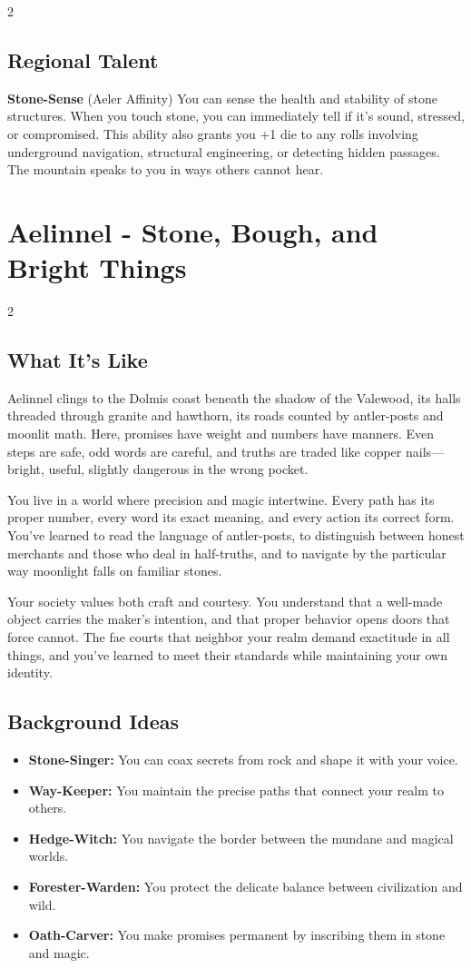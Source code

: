 \documentclass[11pt]{article}
\newcommand{\region}[1]{\section*{#1}}
\newcommand{\subregion}[1]{\subsection*{#1}}
\begin{document}
\begin{multicols}{2}
\subregion{Regional Talent}

\textbf{Stone-Sense} (Aeler Affinity)
You can sense the health and stability of stone structures. When you touch stone, you can immediately tell if it's sound, stressed, or compromised. This ability also grants you +1 die to any rolls involving underground navigation, structural engineering, or detecting hidden passages. The mountain speaks to you in ways others cannot hear.

\end{multicols}

\region{Aelinnel - Stone, Bough, and Bright Things}

\begin{multicols}{2}
\subregion{What It's Like}

Aelinnel clings to the Dolmis coast beneath the shadow of the Valewood, its halls threaded through granite and hawthorn, its roads counted by antler-posts and moonlit math. Here, promises have weight and numbers have manners. Even steps are safe, odd words are careful, and truths are traded like copper nails---bright, useful, slightly dangerous in the wrong pocket.

You live in a world where precision and magic intertwine. Every path has its proper number, every word its exact meaning, and every action its correct form. You've learned to read the language of antler-posts, to distinguish between honest merchants and those who deal in half-truths, and to navigate by the particular way moonlight falls on familiar stones.

Your society values both craft and courtesy. You understand that a well-made object carries the maker's intention, and that proper behavior opens doors that force cannot. The fae courts that neighbor your realm demand exactitude in all things, and you've learned to meet their standards while maintaining your own identity.

\columnbreak

\subregion{Background Ideas}

\begin{itemize}[leftmargin=*]
    \item \textbf{Stone-Singer:} You can coax secrets from rock and shape it with your voice.
    \item \textbf{Way-Keeper:} You maintain the precise paths that connect your realm to others.
    \item \textbf{Hedge-Witch:} You navigate the border between the mundane and magical worlds.
    \item \textbf{Forester-Warden:} You protect the delicate balance between civilization and wild.
    \item \textbf{Oath-Carver:} You make promises permanent by inscribing them in stone and magic.
\end{itemize}


\end{multicols}
\end{document}
